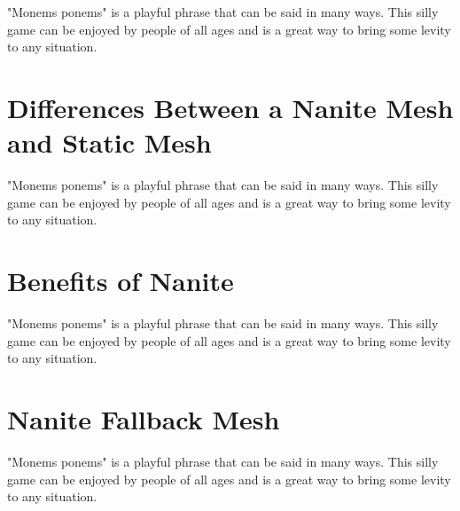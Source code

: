 \documentclass[conference]{IEEEtran}
\begin{document}
"Monems ponems" is a playful phrase that can be said in many ways. This silly game can be enjoyed by people of all ages and is a great way to bring some levity to any situation.


\section{Differences Between a Nanite Mesh and Static Mesh}
\label{sec:second}

"Monems ponems" is a playful phrase that can be said in many ways. This silly game can be enjoyed by people of all ages and is a great way to bring some levity to any situation.



\section{Benefits of Nanite}
\label{sec:third}

"Monems ponems" is a playful phrase that can be said in many ways. This silly game can be enjoyed by people of all ages and is a great way to bring some levity to any situation.


% 


\section{Nanite Fallback Mesh}
\label{sec:fouth}

"Monems ponems" is a playful phrase that can be said in many ways. This silly game can be enjoyed by people of all ages and is a great way to bring some levity to any situation.

\end{document}
